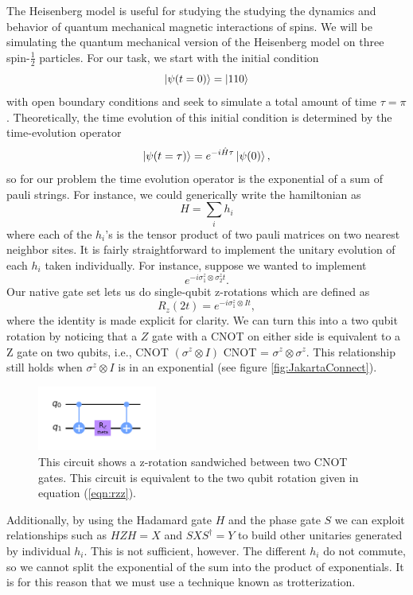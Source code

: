 \documentclass[aps,prl, reprint]{revtex4-2}
\begin{document}
The Heisenberg model is useful for studying the studying the dynamics and behavior of quantum mechanical magnetic interactions of spins. We will be simulating the quantum mechanical version of the Heisenberg model on three spin-$\frac{1}{2}$ particles. For our task, we start with the initial condition
\begin{equation}
\ket{\psi(t=0)} = \ket{110}
\end{equation}
with open boundary conditions and seek to simulate a total amount of time $\tau = \pi$. Theoretically, the time evolution of this initial condition is determined by the time-evolution operator
\begin{equation}
\ket{\psi(t=\tau)} = e^{-i \hat{H} \tau}\ket{\psi(0)},
\end{equation}
so for our problem the time evolution operator is the exponential of a sum of pauli strings. For instance, we could generically write the hamiltonian as
\begin{equation}
H = \sum_i h_i
\end{equation}
where each of the $h_i$'s is the tensor product of two pauli matrices on two nearest neighbor sites. It is fairly straightforward to implement the unitary evolution of each $h_i$ taken individually. For instance, suppose we wanted to implement
\begin{equation}
e^{-i \sigma^{z}_1 \otimes \sigma^{z}_2 t}.
\label{eqn:rzz}
\end{equation}
Our native gate set lets us do single-qubit z-rotations which are defined as
\begin{equation}
R_{z}(2t)=e^{-i \sigma^{z}_1 \otimes I t },
\end{equation}
where the identity is made explicit for clarity. We can turn this into a two qubit rotation by noticing that a $Z$ gate with a CNOT on either side is equivalent to a Z gate on two qubits, i.e., CNOT $(\sigma^{z} \otimes I)$ CNOT = $\sigma^{z} \otimes \sigma^{z}$. This relationship still holds when $\sigma^{z} \otimes I$ is in an exponential (see figure \ref{fig:JakartaConnect}). 
\begin{figure}
\includegraphics[width=0.35\textwidth]{Rzz.png}
\caption{This circuit shows a z-rotation sandwiched between two CNOT gates. This circuit is equivalent to the two qubit rotation given in equation (\ref{eqn:rzz}).}
\label{fig:rzz}
\end{figure}
Additionally, by using the Hadamard gate $H$ and the phase gate $S$ we can exploit relationships such as $HZH = X$ and $S X S^{\dagger}=Y$ to build other unitaries generated by individual $h_i$. This is not sufficient, however. The different $h_i$ do not commute, so we cannot split the exponential of the sum into the product of exponentials. It is for this reason that we must use a technique known as trotterization.
\end{document}

